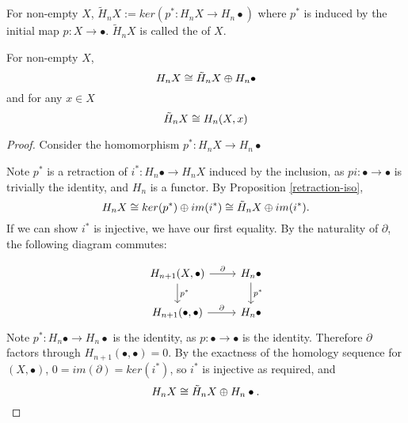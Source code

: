 \begin{definition}
For non-empty $X$, $\tilde{H}_nX:=ker(p^*:H_nX\rightarrow H_n\bullet)$ where $p^*$ is induced by the initial map $p:X\rightarrow \bullet$. $\tilde{H}_nX$ is called the  of $X$.
\end{definition}

\begin{prop}
\label{reduced-homology}
For non-empty $X$,
$$H_nX\cong\tilde{H}_nX\oplus H_n\bullet$$
and for any $x\in X$ $$\tilde{H}_nX\cong H_n(X,x)$$
\end{prop}
\begin{proof}
Consider the homomorphism $p^*:H_nX\rightarrow H_n\bullet$


Note $p^*$ is a retraction of $i^*:H_n\bullet \rightarrow H_n X$ induced by the inclusion, as $pi:\bullet\rightarrow \bullet$ is trivially the identity, and $H_n$ is a functor. By Proposition \ref{retraction-iso}, $$H_nX\cong ker(p^*)\oplus im(i^*) \cong \tilde{H}_nX\oplus im(i^*).$$ If we can show $i^*$ is injective, we have our first equality. By the naturality of $\partial$, the following diagram commutes:

\[\begin{tikzcd}
{H_{n+1}(X,\bullet)} \arrow[r, "\partial"] \arrow[d, "p^*"] & H_n\bullet \arrow[d, "p^*"] \\
{H_{n+1}(\bullet,\bullet)} \arrow[r, "\partial"]              & H_n\bullet                 
\end{tikzcd}\]
Note $p^*:H_n\bullet\rightarrow H_n\bullet$ is the identity, as $p:\bullet\rightarrow\bullet$ is the identity. Therefore $\partial$ factors through $H_{n+1}(\bullet,\bullet)=0$. By the exactness of the homology sequence for $(X,\bullet)$, $0=im(\partial)=ker(i^*)$, so $i^*$ is injective as required, and $$H_nX\cong \tilde{H}_nX\oplus H_n\bullet.$$



\end{proof}
